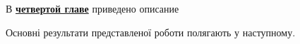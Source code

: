 \documentclass[a5paper,10pt,twoside,openany,article]{memoir} %
\begin{document}
В \underline{\textbf{четвертой главе}} приведено описание








Основні результати представленої роботи полягають у наступному.








%
%
%
%
%
%
%
\end{document}
